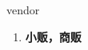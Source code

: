 
\begin{frame}
{\huge vendor}
\begin{center}
\begin{enumerate}\Large
  \item \textbf{小贩，商贩}
\end{enumerate}
\end{center}
\end{frame}
